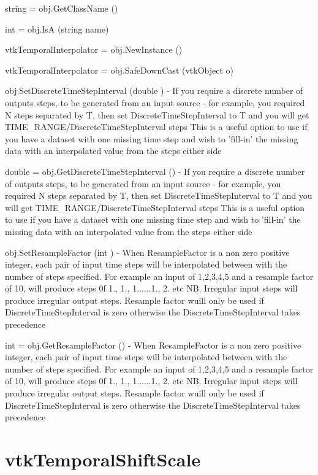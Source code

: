 \begin{DoxyItemize}
\item {\ttfamily string = obj.\-Get\-Class\-Name ()}  
\item {\ttfamily int = obj.\-Is\-A (string name)}  
\item {\ttfamily vtk\-Temporal\-Interpolator = obj.\-New\-Instance ()}  
\item {\ttfamily vtk\-Temporal\-Interpolator = obj.\-Safe\-Down\-Cast (vtk\-Object o)}  
\item {\ttfamily obj.\-Set\-Discrete\-Time\-Step\-Interval (double )} -\/ If you require a discrete number of outputs steps, to be generated from an input source -\/ for example, you required N steps separated by T, then set Discrete\-Time\-Step\-Interval to T and you will get T\-I\-M\-E\-\_\-\-R\-A\-N\-G\-E/\-Discrete\-Time\-Step\-Interval steps This is a useful option to use if you have a dataset with one missing time step and wish to 'fill-\/in' the missing data with an interpolated value from the steps either side  
\item {\ttfamily double = obj.\-Get\-Discrete\-Time\-Step\-Interval ()} -\/ If you require a discrete number of outputs steps, to be generated from an input source -\/ for example, you required N steps separated by T, then set Discrete\-Time\-Step\-Interval to T and you will get T\-I\-M\-E\-\_\-\-R\-A\-N\-G\-E/\-Discrete\-Time\-Step\-Interval steps This is a useful option to use if you have a dataset with one missing time step and wish to 'fill-\/in' the missing data with an interpolated value from the steps either side  
\item {\ttfamily obj.\-Set\-Resample\-Factor (int )} -\/ When Resample\-Factor is a non zero positive integer, each pair of input time steps will be interpolated between with the number of steps specified. For example an input of 1,2,3,4,5 and a resample factor of 10, will produce steps 0f 1., 1., 1......1., 2. etc N\-B. Irregular input steps will produce irregular output steps. Resample factor wuill only be used if Discrete\-Time\-Step\-Interval is zero otherwise the Discrete\-Time\-Step\-Interval takes precedence  
\item {\ttfamily int = obj.\-Get\-Resample\-Factor ()} -\/ When Resample\-Factor is a non zero positive integer, each pair of input time steps will be interpolated between with the number of steps specified. For example an input of 1,2,3,4,5 and a resample factor of 10, will produce steps 0f 1., 1., 1......1., 2. etc N\-B. Irregular input steps will produce irregular output steps. Resample factor wuill only be used if Discrete\-Time\-Step\-Interval is zero otherwise the Discrete\-Time\-Step\-Interval takes precedence  
\end{DoxyItemize}\hypertarget{vtkhybrid_vtktemporalshiftscale}{}\section{vtk\-Temporal\-Shift\-Scale}\label{vtkhybrid_vtktemporalshiftscale}
